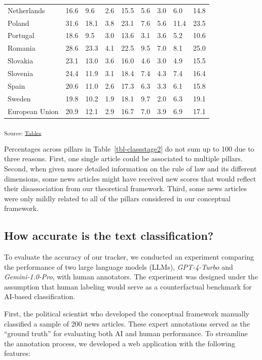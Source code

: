 \documentclass[
]{agujournal2019}
\begin{document}
\begin{longtable}[]{@{}lllllllll@{}}
Netherlands & 16.6 & 9.6 & 2.6 & 15.5 & 5.6 & 3.0 & 6.0 & 14.8 \\
Poland & 31.6 & 18.1 & 3.8 & 23.1 & 7.6 & 5.6 & 11.4 & 23.5 \\
Portugal & 18.6 & 9.5 & 3.0 & 13.6 & 3.1 & 3.6 & 5.2 & 10.6 \\
Romania & 28.6 & 23.3 & 4.1 & 22.5 & 9.5 & 7.0 & 8.1 & 25.0 \\
Slovakia & 23.1 & 13.0 & 3.6 & 16.0 & 4.6 & 3.0 & 4.9 & 15.5 \\
Slovenia & 24.4 & 11.9 & 3.1 & 18.4 & 7.4 & 4.3 & 7.4 & 16.4 \\
Spain & 20.6 & 11.0 & 2.6 & 17.3 & 6.3 & 3.3 & 6.1 & 15.8 \\
Sweden & 19.8 & 10.2 & 1.9 & 18.1 & 9.7 & 2.0 & 6.3 & 19.1 \\
European Union & 20.9 & 12.1 & 2.9 & 16.7 & 7.0 & 3.9 & 6.9 & 17.1 \\

\end{longtable}

\textsubscript{Source:
\href{https://ctoruno.github.io/eu-rol-tracker/notebooks/tables-preview.html\#cell-tbl-classstage2}{Tables}}

Percentages across pillars in Table~\ref{tbl-classstage2} do not sum up
to 100 due to three reasons. First, one single article could be
associated to multiple pillars. Second, when given more detailed
information on the rule of law and its different dimensions, some news
articles might have received new scores that would reflect their
disassociation from our theoretical framework. Third, some news articles
were only mildly related to all of the pillars considered in our
conceptual framework.

\subsection{How accurate is the text
classification?}\label{sec-accuracy}

To evaluate the accuracy of our tracker, we conducted an experiment
comparing the performance of two large language models (LLMs),
\emph{GPT-4-Turbo} and \emph{Gemini-1.0-Pro}, with human annotators. The
experiment was designed under the assumption that human labeling would
serve as a counterfactual benchmark for AI-based classification.

First, the political scientist who developed the conceptual framework
manually classified a sample of 200 news articles. These expert
annotations served as the ``ground truth'' for evaluating both AI and
human performance. To streamline the annotation process, we developed a
web application with the following features:
\end{document}
